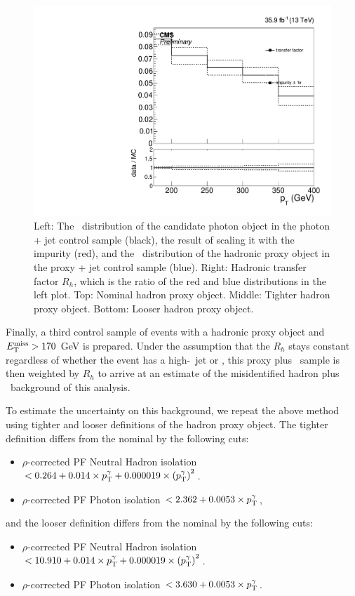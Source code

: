 \begin{figure}[htbp]
\begin{center}
    \includegraphics[width=0.45\linewidth]{Analysis/Figures/hfake/tfactorLoose.pdf}
    \caption{
      Left: The \pt\ distribution of the candidate photon object in the photon + jet control sample (black), the result of scaling it with the impurity (red), and the \pt\ distribution of the hadronic proxy object in the proxy + jet control sample (blue).
      Right: Hadronic transfer factor $R_{h}$, which is the ratio of the red and blue distributions in the left plot. 
      Top: Nominal hadron proxy object. 
      Middle: Tighter hadron proxy object. 
      Bottom: Looser hadron proxy object.
    }
    \label{fig:hadronTFactor}
  \end{center}
\end{figure}

Finally, a third control sample of events with a hadronic proxy object and $E_{\mathrm{T}}^{\text{miss}} > 170$ GeV is prepared. 
Under the assumption that the $R_{h}$ stays constant regardless of whether the event has a high-\pt\ jet or \met, this proxy plus \met\ sample is then weighted by $R_{h}$ to arrive at an estimate of the misidentified hadron plus \met\ background of this analysis.

To estimate the uncertainty on this background, we repeat the above method using tighter and looser definitions of the hadron proxy object.
The tighter definition differs from the nominal by the following cuts:
\begin{itemize}
\item $\rho$-corrected PF Neutral Hadron isolation $< 0.264 + 0.014 \times p_{\mathrm{T}}^\gamma + 0.000019 \times \left( p_{\mathrm{T}}^\gamma \right)^2$. 
\item $\rho$-corrected PF Photon isolation $< 2.362 + 0.0053 \times p_{\mathrm{T}}^\gamma$,
\end{itemize}
and the looser definition differs from the nominal by the following cuts:
\begin{itemize}
\item $\rho$-corrected PF Neutral Hadron isolation $< 10.910 + 0.014 \times p_{\mathrm{T}}^\gamma + 0.000019 \times \left( p_{\mathrm{T}}^\gamma \right)^2$. 
\item $\rho$-corrected PF Photon isolation $< 3.630 + 0.0053 \times p_{\mathrm{T}}^\gamma$.
\end{itemize}

